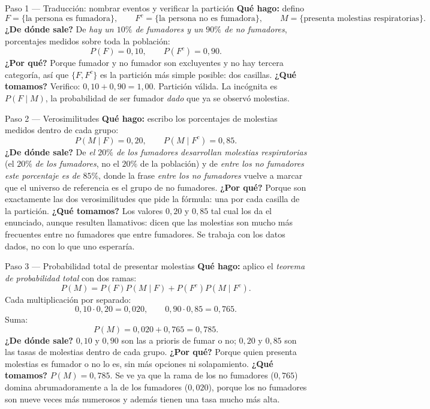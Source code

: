 \documentclass[11pt]{article}
\begin{document}
\begin{sol}

\begin{paso}{Paso 1 --- Traducción: nombrar eventos y verificar la partición}
\textbf{Qué hago:} defino
\[
F=\{\text{la persona es fumadora}\},\qquad F^{c}=\{\text{la persona no es fumadora}\},\qquad M=\{\text{presenta molestias respiratorias}\}.
\]
\textbf{¿De dónde sale?} De \emph{hay un $10\%$ de fumadores y un $90\%$ de no fumadores}, porcentajes medidos sobre toda la población:
\[
P(F)=0,10,\qquad P(F^{c})=0,90.
\]
\textbf{¿Por qué?} Porque fumador y no fumador son excluyentes y no hay tercera categoría, así que $\{F,F^{c}\}$ es la partición más simple posible: dos casillas.
\textbf{¿Qué tomamos?} Verifico: $0,10+0,90=1,00$. Partición válida. La incógnita es $P(F\mid M)$, la probabilidad de ser fumador \emph{dado} que ya se observó molestias.
\end{paso}

\begin{paso}{Paso 2 --- Verosimilitudes}
\textbf{Qué hago:} escribo los porcentajes de molestias medidos dentro de cada grupo:
\[
P(M\mid F)=0,20,\qquad P(M\mid F^{c})=0,85.
\]
\textbf{¿De dónde sale?} De \emph{el $20\%$ de los fumadores desarrollan molestias respiratorias} (el $20\%$ \emph{de los fumadores}, no el $20\%$ de la población) y de \emph{entre los no fumadores este porcentaje es de $85\%$}, donde la frase \emph{entre los no fumadores} vuelve a marcar que el universo de referencia es el grupo de no fumadores.
\textbf{¿Por qué?} Porque son exactamente las dos verosimilitudes que pide la fórmula: una por cada casilla de la partición.
\textbf{¿Qué tomamos?} Los valores $0,20$ y $0,85$ tal cual los da el enunciado, aunque resulten llamativos: dicen que las molestias son mucho más frecuentes entre no fumadores que entre fumadores. Se trabaja con los datos dados, no con lo que uno esperaría.
\end{paso}

\begin{paso}{Paso 3 --- Probabilidad total de presentar molestias}
\textbf{Qué hago:} aplico el \emph{teorema de probabilidad total} con dos ramas:
\[
P(M)=P(F)P(M\mid F)+P(F^{c})P(M\mid F^{c}).
\]
Cada multiplicación por separado:
\[
0,10\cdot 0,20=0,020,\qquad 0,90\cdot 0,85=0,765.
\]
Suma:
\[
P(M)=0,020+0,765=0,785.
\]
\textbf{¿De dónde sale?} $0,10$ y $0,90$ son las a prioris de fumar o no; $0,20$ y $0,85$ son las tasas de molestias dentro de cada grupo.
\textbf{¿Por qué?} Porque quien presenta molestias es fumador o no lo es, sin más opciones ni solapamiento.
\textbf{¿Qué tomamos?} $P(M)=0,785$. Se ve ya que la rama de los no fumadores ($0,765$) domina abrumadoramente a la de los fumadores ($0,020$), porque los no fumadores son nueve veces más numerosos y además tienen una tasa mucho más alta.
\end{paso}


\end{sol}
\end{document}
